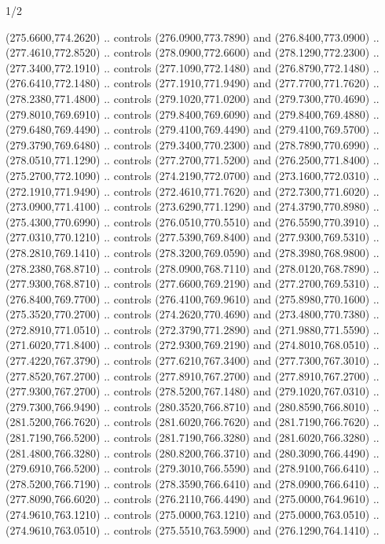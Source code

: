 \begin{flagdescription}{1/2}
\begin{scope}[xshift=0.5\flaglength]
\begin{scope}[scale=0.00745\flagwidth,xshift=-12.1mm,yshift=41.7mm]
\begin{scope}[y=0.80pt, x=0.80pt, yscale=-1, xscale=1, inner sep=0pt, outer sep=0pt]
\begin{scope}[cm={{1.33333,0.0,0.0,-1.33333,(0.0,114.66667)}}]
\begin{scope}[scale=0.100]
  (275.6600,774.2620) .. controls (276.0900,773.7890) and (276.8400,773.0900) ..
  (277.4610,772.8520) .. controls (278.0900,772.6600) and (278.1290,772.2300) ..
  (277.3400,772.1910) .. controls (277.1090,772.1480) and (276.8790,772.1480) ..
  (276.6410,772.1480) .. controls (277.1910,771.9490) and (277.7700,771.7620) ..
  (278.2380,771.4800) .. controls (279.1020,771.0200) and (279.7300,770.4690) ..
  (279.8010,769.6910) .. controls (279.8400,769.6090) and (279.8400,769.4880) ..
  (279.6480,769.4490) .. controls (279.4100,769.4490) and (279.4100,769.5700) ..
  (279.3790,769.6480) .. controls (279.3400,770.2300) and (278.7890,770.6990) ..
  (278.0510,771.1290) .. controls (277.2700,771.5200) and (276.2500,771.8400) ..
  (275.2700,772.1090) .. controls (274.2190,772.0700) and (273.1600,772.0310) ..
  (272.1910,771.9490) .. controls (272.4610,771.7620) and (272.7300,771.6020) ..
  (273.0900,771.4100) .. controls (273.6290,771.1290) and (274.3790,770.8980) ..
  (275.4300,770.6990) .. controls (276.0510,770.5510) and (276.5590,770.3910) ..
  (277.0310,770.1210) .. controls (277.5390,769.8400) and (277.9300,769.5310) ..
  (278.2810,769.1410) .. controls (278.3200,769.0590) and (278.3980,768.9800) ..
  (278.2380,768.8710) .. controls (278.0900,768.7110) and (278.0120,768.7890) ..
  (277.9300,768.8710) .. controls (277.6600,769.2190) and (277.2700,769.5310) ..
  (276.8400,769.7700) .. controls (276.4100,769.9610) and (275.8980,770.1600) ..
  (275.3520,770.2700) .. controls (274.2620,770.4690) and (273.4800,770.7380) ..
  (272.8910,771.0510) .. controls (272.3790,771.2890) and (271.9880,771.5590) ..
  (271.6020,771.8400) .. controls (272.9300,769.2190) and (274.8010,768.0510) ..
  (277.4220,767.3790) .. controls (277.6210,767.3400) and (277.7300,767.3010) ..
  (277.8520,767.2700) .. controls (277.8910,767.2700) and (277.8910,767.2700) ..
  (277.9300,767.2700) .. controls (278.5200,767.1480) and (279.1020,767.0310) ..
  (279.7300,766.9490) .. controls (280.3520,766.8710) and (280.8590,766.8010) ..
  (281.5200,766.7620) .. controls (281.6020,766.7620) and (281.7190,766.7620) ..
  (281.7190,766.5200) .. controls (281.7190,766.3280) and (281.6020,766.3280) ..
  (281.4800,766.3280) .. controls (280.8200,766.3710) and (280.3090,766.4490) ..
  (279.6910,766.5200) .. controls (279.3010,766.5590) and (278.9100,766.6410) ..
  (278.5200,766.7190) .. controls (278.3590,766.6410) and (278.0900,766.6410) ..
  (277.8090,766.6020) .. controls (276.2110,766.4490) and (275.0000,764.9610) ..
  (274.9610,763.1210) .. controls (275.0000,763.1210) and (275.0000,763.0510) ..
  (274.9610,763.0510) .. controls (275.5510,763.5900) and (276.1290,764.1410) ..

\end{scope}
\end{scope}
\end{scope}
\end{scope}
\end{scope}
\end{flagdescription}
